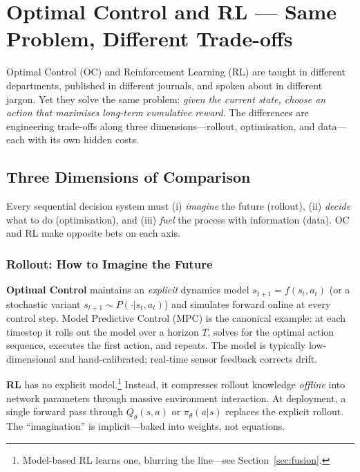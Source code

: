 \chapter{Optimal Control and RL --- Same Problem, Different Trade-offs}
\label{ch:oc-vs-rl}

Optimal Control (OC) and Reinforcement Learning (RL) are taught in different departments, published in different journals, and spoken about in different jargon.
Yet they solve the same problem: \emph{given the current state, choose an action that maximises long-term cumulative reward}.
The differences are engineering trade-offs along three dimensions---rollout, optimisation, and data---each with its own hidden costs.

\section{Three Dimensions of Comparison}
\label{sec:oc-rl-3d}

\begin{keyidea}
Every sequential decision system must (i) \emph{imagine} the future (rollout), (ii) \emph{decide} what to do (optimisation), and (iii) \emph{fuel} the process with information (data).
OC and RL make opposite bets on each axis.
\end{keyidea}

\subsection{Rollout: How to Imagine the Future}

\textbf{Optimal Control} maintains an \emph{explicit} dynamics model
$s_{t+1} = f(s_t, a_t)$ (or a stochastic variant $s_{t+1}\sim P(\cdot|s_t,a_t)$)
and simulates forward online at every control step.
Model Predictive Control (MPC) is the canonical example: at each timestep it rolls out the model over a horizon $T$, solves for the optimal action sequence, executes the first action, and repeats.
The model is typically low-dimensional and hand-calibrated; real-time sensor feedback corrects drift.

\textbf{RL} has no explicit model.\footnote{Model-based RL learns one, blurring the line---see Section~\ref{sec:fusion}.}
Instead, it compresses rollout knowledge \emph{offline} into network parameters through massive environment interaction.
At deployment, a single forward pass through $Q_\theta(s,a)$ or $\pi_\theta(a|s)$ replaces the explicit rollout.
The ``imagination'' is implicit---baked into weights, not equations.


